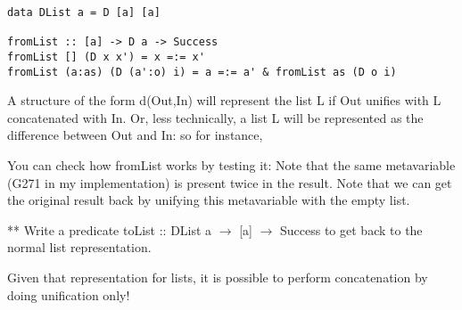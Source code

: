 \documentclass{article}
\newcounter{question}
\newcommand{\answer}[1]{}
\newcommand{\correctedLastYear}[1]{}
\begin{document}
\Curry{}
\begin{verbatim}
data DList a = D [a] [a]

fromList :: [a] -> D a -> Success
fromList [] (D x x') = x =:= x'
fromList (a:as) (D (a':o) i) = a =:= a' & fromList as (D o i)
\end{verbatim}


A structure of the form \textsf{d(Out,In)} will represent the list
\textsf{L} if \textsf{Out} unifies with \textsf{L} concatenated with
\textsf{In}. Or, less technically, a list L will be represented as the
difference between Out and In: so for instance,



You can check how fromList works by testing it:
Note that the same metavariable (G271 in my implementation) is present twice in
the result. Note that we can get the original result back by unifying this
metavariable with the empty list.

\begin{question}{**\correctedLastYear6}
Write a predicate \textsf{toList :: DList a $\rightarrow$ [a] $\rightarrow$ Success} to get back to the normal list representation.

\answer{
\begin{prolog}
toList(d(X,X),[]).
toList(d(Head:Rest,Tail),[Head|OtherTail]):- toList(d(Rest,Tail),OtherTail).
\end{prolog}

toList (D x y) [] = x =:= y
toList (D (head:rest) tail) (head':otherTail) = head =:= head' & toList (D rest tail) otherTail
}

\end{question}

Given that representation for lists, it is possible to perform concatenation by
doing unification only!
\end{document}
